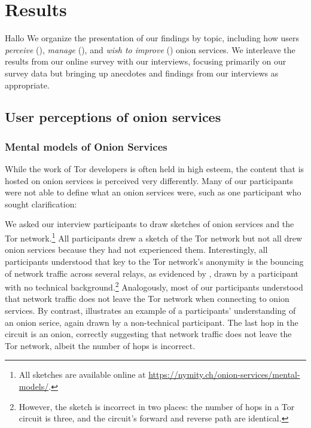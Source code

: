 \section{Results}
\label{sec:results}
Hallo
We organize the presentation of our findings by topic, including how users
\emph{perceive} (), \emph{manage} (),
and \emph{wish to improve} () onion services.  We interleave the
results from our online survey with our interviews, focusing primarily on our
survey data but bringing up anecdotes and findings from our interviews as
appropriate.

\subsection{User perceptions of onion services}
\label{sec:perception}

\subsubsection{Mental models of Onion Services}
While the work of Tor developers is often held in high esteem, the content that
is hosted on onion services is perceived very differently.  Many of our participants were not able to define what an onion services were, such as one participant who sought clarification: 

We asked our interview participants to draw sketches of onion services and the Tor network.\footnote{All sketches are available online at
\url{https://nymity.ch/onion-services/mental-models/}.}  All participants drew a
sketch of the Tor network but not all drew onion services because they had not
experienced them.   Interestingly, all participants understood that key to the
Tor network's anonymity is the bouncing of network traffic across several
relays, as evidenced by , drawn by a participant with no
technical background.\footnote{However, the sketch is incorrect in two places: the
number of hops in a Tor circuit is three, and the circuit's forward and reverse
path are identical.} Analogously, most of our participants understood that
network traffic does not leave the Tor network when connecting to onion
services. By contrast,  illustrates an example of a participants' understanding of an onion serice, again drawn by a
non-technical participant.  The last hop in the circuit is an onion, correctly
suggesting that network traffic does not leave the Tor network, albeit the
number of hops is incorrect.

